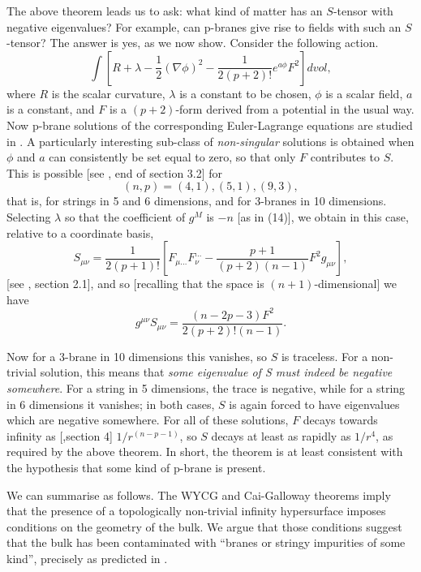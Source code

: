 \documentclass[a4paper,12pt]{article}
\theoremstyle{definition}
\renewcommand{\u}{\textit}
\renewcommand{\-}{$\dfrac{\quad\enspace}{\quad}$}
\begin{document}
The above theorem leads us to ask: what kind of matter has an $S$-tensor with negative
eigenvalues? For example, can p-branes give rise to fields with such an $S$-tensor? The
answer is yes, as we now show. Consider the following action.
\begin{equation*}
\int [R+\lambda-\frac{1}{2}(\nabla\phi)^2-\frac{1}{2(p+2)!}e^{a\phi}F^2]dvol,
\end{equation*}
where $R$ is the scalar curvature, $\lambda$ is a constant to be chosen, $\phi$ is a scalar
field, $a$ is a constant, and $F$ is a $(p+2)$-form derived from a potential in the usual
way. Now p-brane solutions of the corresponding Euler-Lagrange equations are studied in
\cite{22}. A particularly interesting sub-class of \u{non-singular} solutions is obtained
when $\phi$ and $a$ can consistently be set equal to zero, so that only $F$ contributes to
$S$. This is possible [see \cite{22}, end of section 3.2] for
\begin{equation*}
(n,p) = (4,1), (5,1), (9,3),
\end{equation*}
that is, for strings in 5 and 6 dimensions, and for 3-branes in 10 dimensions. Selecting
$\lambda$ so that the coefficient of $g^M$ is $-n$ [as in (14)], we obtain in this case,
relative to a coordinate basis,
\begin{equation*}
S_{\mu\nu}=\frac{1}{2(p+1)!}[F_{\mu...}F_{\nu}^{...}-\frac{p+1}{(p+2)(n-1)}F^2g_{\mu\nu}],
\end{equation*}
[see \cite{22}, section 2.1], and so [recalling that the space is $(n+1)$-dimensional]
we have
\begin{equation*}
g^{\mu\nu}S_{\mu\nu}=\frac{(n-2p-3)F^2}{2(p+2)!(n-1)}.
\end{equation*}

Now for a 3-brane in 10 dimensions this vanishes, so $S$ is traceless. For a non-trivial
solution, this means that \u{some eigenvalue of S must indeed be negative somewhere}. For
a string in 5 dimensions, the trace is negative, while for a string in 6 dimensions it
vanishes; in both cases, $S$ is again forced to have eigenvalues which are negative somewhere.
For all of these solutions, $F$ decays towards infinity as [\cite{22},section 4] 
$1/r^{(n-p-1)}$, so $S$ decays at least as rapidly as $1/r^4$, as required by the above 
theorem. In short, the theorem is at least consistent with the hypothesis that some kind
of p-brane is present.

We can summarise as follows. The WYCG and Cai-Galloway theorems imply that the presence
of a topologically non-trivial infinity hypersurface imposes conditions on the geometry
of the bulk. We argue that those conditions suggest that the bulk has been contaminated
with ``branes or stringy impurities of some kind'', precisely as predicted in \cite{3}.
\end{document}
